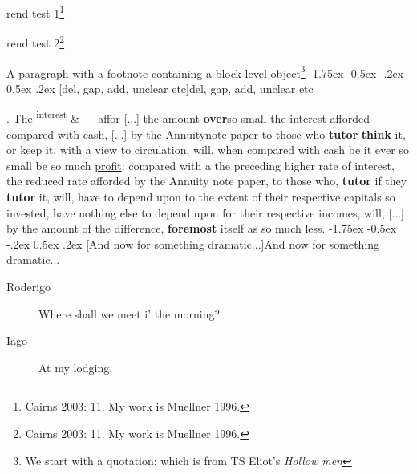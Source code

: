 \documentclass[11pt,twoside]{article}\makeatletter
\makeatletter
\renewcommand\section{\@startsection {section}{1}{\z@}%
     {-1.75ex \@plus -0.5ex \@minus -.2ex}%
     {0.5ex \@plus .2ex}%
     {\reset@font\Large\bfseries\sffamily}}
\renewcommand\subsection{\@startsection{subsection}{2}{\z@}%
     {-1.75ex\@plus -0.5ex \@minus- .2ex}%
     {0.5ex \@plus .2ex}%
     {\reset@font\Large\sffamily}}
\def\DivII{\subsection}
\def\DivII{\section}
\makeatother
\begin{document}
 \par
{rend test 1}\footnote{Cairns 2003: 11. My work is Muellner 1996.}\par
{rend test 2}\footnote{Cairns 2003: 11. My work is Muellner 1996.}\par
A paragraph with a footnote containing a block-level object\footnote{We start with a quotation:
 which is from TS Eliot's \textit{Hollow men}}
\DivII[del, gap, add, unclear etc]{del, gap, add, unclear etc}\par
[...]. The \textsuperscript{interest} & — affor [...] the amount \textbf{over}{\hskip1pt}\newline  so small the interest afforded compared with cash, [...] by the Annuity{\hskip1pt}\newline  note paper to those who \textbf{tutor} \textbf{think} it, or keep it, with a view {\hskip1pt}\newline  to circulation, will, when compared with cash be it ever so small be {\hskip1pt}\newline  so much \uline{profit}: compared with a the preceding higher {\hskip1pt}\newline  rate of interest, the reduced rate afforded by the Annuity {\hskip1pt}\newline  note paper, to those who, \textbf{tutor} if they \textbf{tutor} it, {\hskip1pt}\newline  will, have to depend upon to the extent of their {\hskip1pt}\newline  respective capitals so invested, have nothing else {\hskip1pt}\newline  to depend upon for their respective incomes, will, [...] by the {\hskip1pt}\newline  amount of the difference, \textbf{foremost} itself as so {\hskip1pt}\newline  much less.
\DivII[And now for something dramatic...]{And now for something dramatic...} \begin{description} \item[Roderigo] 

Where shall we meet i' the morning?\end{description}
 \begin{description} \item[Iago] 

At my lodging.\end{description}
\end{document}
